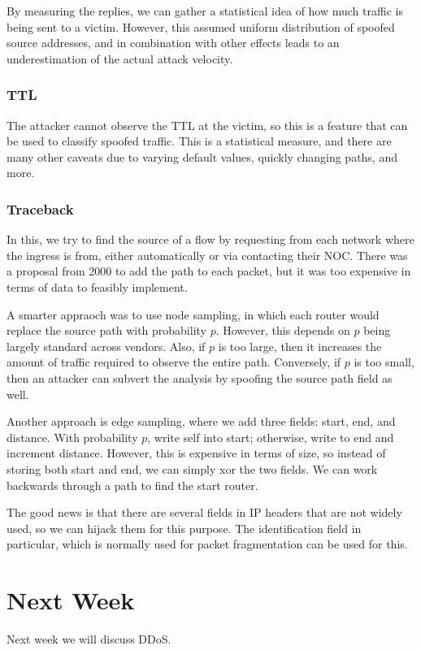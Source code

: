\documentclass{idc_msc}
\begin{document}
By measuring the replies, we can gather a statistical idea of how much traffic is being sent to a victim.
However, this assumed uniform distribution of spoofed source addresses, and in combination with other effects leads to an underestimation of the actual attack velocity.

\subsubsection{TTL}

The attacker cannot observe the TTL at the victim, so this is a feature that can be used to classify spoofed traffic.
This is a statistical measure, and there are many other caveats due to varying default values, quickly changing paths, and more.

\subsubsection{Traceback}

In this, we try to find the source of a flow by requesting from each network where the ingress is from, either automatically or via contacting their NOC.
There was a proposal from 2000\cite{Savage:2000:PNS:347059.347560} to add the path to each packet, but it was too expensive in terms of data to feasibly implement.

A smarter appraoch was to use node sampling, in which each router would replace the source path with probability \(p\).
However, this depends on \(p\) being largely standard across vendors.
Also, if \(p\) is too large, then it increases the amount of traffic required to observe the entire path.
Conversely, if \(p\) is too small, then an attacker can subvert the analysis by spoofing the source path field as well.

Another approach is edge sampling, where we add three fields: start, end, and distance.
With probability \(p\), write self into start; otherwise, write to end and increment distance.
However, this is expensive in terms of size, so instead of storing both start and end, we can simply xor the two fields.
We can work backwards through a path to find the start router.

The good news is that there are several fields in IP headers that are not widely used, so we can hijack them for this purpose.
The identification field in particular, which is normally used for packet fragmentation can be used for this.

\section{Next Week}

Next week we will discuss DDoS.
\end{document}
